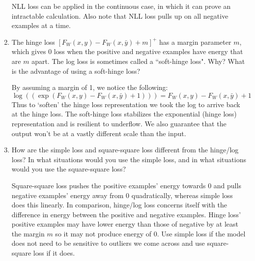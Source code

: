 \documentclass{article}
\begin{document}
\begin{enumerate}
\begin{tcolorbox}
		      NLL loss can be applied in the continuous case, in
		      which it can prove an intractable calculation. Also note that NLL loss pulls up
		      on all negative examples at a time.
	      \end{tcolorbox}
	\item The hinge loss $[F_W(x, y)- F_W (x, \bar{y}) + m]^{+}$
	      has a margin parameter $m$, which gives 0 loss when the positive and negative
	      examples have energy that are $m$ apart. The log loss is sometimes called a
	      ``soft-hinge loss". Why? What is the advantage of using a soft-hinge loss?
	      \begin{tcolorbox}
		      By assuming a margin of 1, we notice the following:
			   $$\log (\left(\exp(F_W(x,y)-F_W(x,\bar{y})+1) \right)) = F_W(x,y)-F_W(x,\bar{y})+1$$ 
			   Thus to `soften' the hinge loss representation we took the log to arrive back at the 
			   hinge loss. The soft-hinge loss stabilizes the exponential (hinge loss) 
			   representation and is resilient to underflow. We also guarantee that the 
			   output won't be at a vastly different scale than the input.
	      \end{tcolorbox}
	\item How are the simple loss and square-square loss different
	      from the hinge/log loss? In what situations would you use the simple loss, and
	      in what situations would you use the square-square loss?
	      \begin{tcolorbox}
		      Square-square loss pushes the positive examples' energy
		      towards 0 and pulls negative examples' energy away from 0 quadratically,
		      whereas simple loss does this linearly. In comparison, hinge/log loss concerns
		      itself with the difference in energy between the positive and negative
		      examples. Hinge loss' positive examples may have lower energy than those of negative by at
		      least the margin $m$ so it may not produce energy of 0. Use
		      simple loss if the model does not need to be sensitive to outliers we come
		      across and use square-square loss if it does.
	      \end{tcolorbox}
\end{enumerate}
\end{document}
